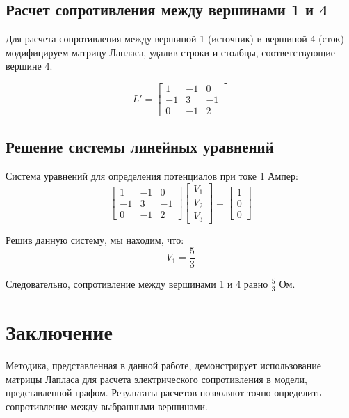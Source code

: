 \documentclass[14pt]{article}
\begin{document}
	\subsection{Расчет сопротивления между вершинами 1 и 4}
	
	Для расчета сопротивления между вершиной 1 (источник) и вершиной 4 (сток) модифицируем матрицу Лапласа, удалив строки и столбцы, соответствующие вершине 4.
	
	\[
	L' = \begin{bmatrix}
		1 & -1 & 0 \\
		-1 & 3 & -1 \\
		0 & -1 & 2
	\end{bmatrix}
	\]
	
	\subsection{Решение системы линейных уравнений}
	Система уравнений для определения потенциалов при токе 1 Ампер:
	\[
	\begin{bmatrix}
		1 & -1 & 0 \\
		-1 & 3 & -1 \\
		0 & -1 & 2
	\end{bmatrix}
	\begin{bmatrix}
		V_1 \\
		V_2 \\
		V_3
	\end{bmatrix}
	= \begin{bmatrix}
		1 \\
		0 \\
		0
	\end{bmatrix}
	\]
	
	Решив данную систему, мы находим, что:
	\[
	V_1 = \frac{5}{3}
	\]
	
	Следовательно, сопротивление между вершинами 1 и 4 равно \( \frac{5}{3} \) Ом.
	
	\section{Заключение}
	Методика, представленная в данной работе, демонстрирует использование матрицы Лапласа для расчета электрического сопротивления в модели, представленной графом. Результаты расчетов позволяют точно определить сопротивление между выбранными вершинами.
	
\end{document}

